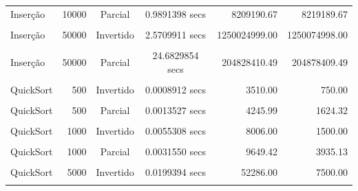 \documentclass[
]{article}
\begin{document}
\begin{longtable}[l]{lrccrr}
Inserção & 10000 & Parcial & 0.9891398 secs & 8209190.67 & 8219189.67\\
\cellcolor{gray!15}{Inserção} & \cellcolor{gray!15}{50000} & \cellcolor{gray!15}{Aleatório} & \cellcolor{gray!15}{1.2550940 secs} & \cellcolor{gray!15}{625139777.91} & \cellcolor{gray!15}{625189776.91}\\
Inserção & 50000 & Invertido & 2.5709911 secs & 1250024999.00 & 1250074998.00\\
\cellcolor{gray!15}{Inserção} & \cellcolor{gray!15}{50000} & \cellcolor{gray!15}{Ordenado} & \cellcolor{gray!15}{0.0066781 secs} & \cellcolor{gray!15}{49999.00} & \cellcolor{gray!15}{99998.00}\\
Inserção & 50000 & Parcial & 24.6829854 secs & 204828410.49 & 204878409.49\\
\cellcolor{gray!15}{QuickSort} & \cellcolor{gray!15}{500} & \cellcolor{gray!15}{Aleatório} & \cellcolor{gray!15}{0.0016056 secs} & \cellcolor{gray!15}{4693.96} & \cellcolor{gray!15}{3134.49}\\
QuickSort & 500 & Invertido & 0.0008912 secs & 3510.00 & 750.00\\
\cellcolor{gray!15}{QuickSort} & \cellcolor{gray!15}{500} & \cellcolor{gray!15}{Ordenado} & \cellcolor{gray!15}{0.0009573 secs} & \cellcolor{gray!15}{3753.00} & \cellcolor{gray!15}{0.00}\\
QuickSort & 500 & Parcial & 0.0013527 secs & 4245.99 & 1624.32\\
\cellcolor{gray!15}{QuickSort} & \cellcolor{gray!15}{1000} & \cellcolor{gray!15}{Aleatório} & \cellcolor{gray!15}{0.0042355 secs} & \cellcolor{gray!15}{10498.21} & \cellcolor{gray!15}{6969.87}\\
QuickSort & 1000 & Invertido & 0.0055308 secs & 8006.00 & 1500.00\\
\cellcolor{gray!15}{QuickSort} & \cellcolor{gray!15}{1000} & \cellcolor{gray!15}{Ordenado} & \cellcolor{gray!15}{0.0020545 secs} & \cellcolor{gray!15}{8498.00} & \cellcolor{gray!15}{0.00}\\
QuickSort & 1000 & Parcial & 0.0031550 secs & 9649.42 & 3935.13\\
\cellcolor{gray!15}{QuickSort} & \cellcolor{gray!15}{5000} & \cellcolor{gray!15}{Aleatório} & \cellcolor{gray!15}{0.0350165 secs} & \cellcolor{gray!15}{65796.11} & \cellcolor{gray!15}{42854.85}\\
QuickSort & 5000 & Invertido & 0.0199394 secs & 52286.00 & 7500.00\\
\cellcolor{gray!15}{QuickSort} & \cellcolor{gray!15}{5000} & \cellcolor{gray!15}{Ordenado} & \cellcolor{gray!15}{0.0200574 secs} & \cellcolor{gray!15}{54774.00} & \cellcolor{gray!15}{0.00}\\

\end{longtable}
\end{document}
